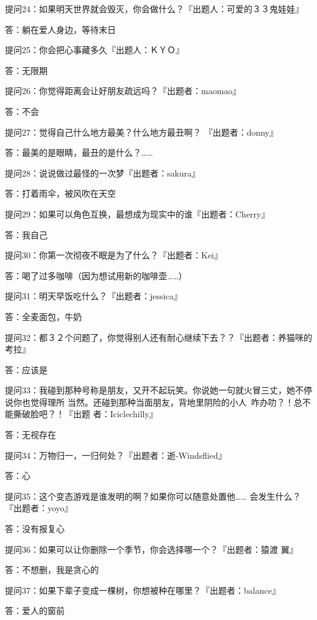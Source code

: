 \documentclass[12pt,a4paper]{article}
\def\blankrev{\vspace{1ex}}									%
\begin{document}
		\blankrev
		提问24：如果明天世界就会毁灭，你会做什么？『出题人：可爱的３３鬼娃娃』\par
		答：躺在爱人身边，等待末日

		\blankrev
		提问25：你会把心事藏多久『出题人：ＫＹＯ』\par
		答：无限期

		\blankrev
		提问26：你觉得距离会让好朋友疏远吗？『出题者：maomao』\par
		答：不会

		\blankrev
		提问27：觉得自己什么地方最美？什么地方最丑啊？ 『出题者：donny』\par
		答：最美的是眼睛，最丑的是什么？……

		\blankrev
		提问28：说说做过最怪的一次梦『出题者：sakura』\par
		答：打着雨伞，被风吹在天空

		\blankrev
		提问29：如果可以角色互换，最想成为现实中的谁『出题者：Cherry』\par
		答：我自己

		\blankrev
		提问30：你第一次彻夜不眠是为了什么？『出题者：Kei』\par
		答：喝了过多咖啡（因为想试用新的咖啡壶……）

		\blankrev
		提问31：明天早饭吃什么？『出题者：jessica』\par
		答：全麦面包，牛奶

		\blankrev
		提问32：都３２个问题了，你觉得别人还有耐心继续下去？？『出题者：养猫咪的考拉』\par
		答：应该是

		\blankrev
		提问33：我碰到那种号称是朋友，又开不起玩笑。你说她一句就火冒三丈，她不停说你也觉得理所
				当然。还碰到那种当面朋友，背地里阴险的小人~咋办叻？！总不能撕破脸吧？！『出题
				者：Iciclechilly』\par
		答：无视存在

		\blankrev
		提问34：万物归一，一归何处？『出题者：逝-Windsflied』\par
		答：心

		\blankrev
		提问35：这个变态游戏是谁发明的啊？如果你可以随意处置他…… 会发生什么？ 『出题者：yoyo』\par
		答：没有报复心

		\blankrev
		提问36：如果可以让你删除一个季节，你会选择哪一个？『出题者：猿渡 翼』\par
		答：不想删，我是贪心的

		\blankrev
		提问37：如果下辈子变成一棵树，你想被种在哪里？『出题者：balance』\par
		答：爱人的窗前
\end{document}
